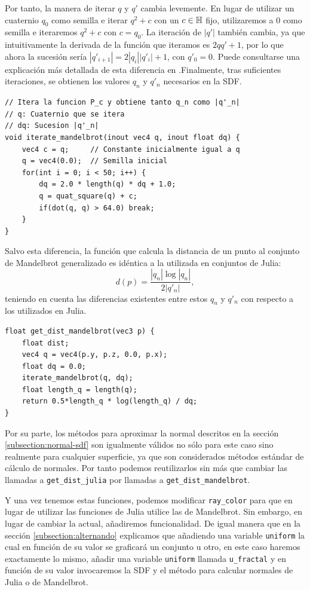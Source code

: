 Por tanto, la manera de iterar $q$ y $q'$ cambia levemente. En lugar de utilizar un cuaternio $q_0$ como semilla e iterar $q^2+c$ con un $c\in\mathbb{H}$ fijo, utilizaremos a $0$ como semilla e iteraremos $q^2+c$ con $c=q_0$. La iteración de $|q'|$ también cambia, ya que intuitivamente la derivada de la función que iteramos es $2qq'+1$, por lo que ahora la sucesión sería $|q'_{i+1}|=2|q_i||q'_i|+1$, con $q'_0=0$. Puede consultarse una explicación más detallada de esta diferencia en \cite{distance-fractals}.Finalmente, tras suficientes iteraciones, se obtienen los valores $q_n$ y $q'_n$ necesarios en la SDF.

\begin{lstlisting}
// Itera la funcion P_c y obtiene tanto q_n como |q'_n|
// q: Cuaternio que se itera
// dq: Sucesion |q'_n|
void iterate_mandelbrot(inout vec4 q, inout float dq) {
    vec4 c = q;     // Constante inicialmente igual a q
    q = vec4(0.0);  // Semilla inicial
    for(int i = 0; i < 50; i++) {
        dq = 2.0 * length(q) * dq + 1.0;
        q = quat_square(q) + c;
        if(dot(q, q) > 64.0) break;
    }
}
\end{lstlisting}

Salvo esta diferencia, la función que calcula la distancia de un punto al conjunto de Mandelbrot generalizado es idéntica a la utilizada en conjuntos de Julia: 
$$
d(p)=\dfrac{|q_n|\log|q_n|}{2|q'_n|},
$$
teniendo en cuenta las diferencias existentes entre estos $q_n$ y $q'_n$ con respecto a los utilizados en Julia.

\begin{lstlisting}
float get_dist_mandelbrot(vec3 p) {
    float dist;
    vec4 q = vec4(p.y, p.z, 0.0, p.x);
    float dq = 0.0;
    iterate_mandelbrot(q, dq);
    float length_q = length(q);
    return 0.5*length_q * log(length_q) / dq;
}
\end{lstlisting}

Por su parte, los métodos para aproximar la normal descritos en la sección \ref{subsection:normal-sdf} son igualmente válidos no sólo para este caso sino realmente para cualquier superficie, ya que son considerados métodos estándar de cálculo de normales. Por tanto podemos reutilizarlos sin más que cambiar las llamadas a \verb|get_dist_julia| por llamadas a \verb|get_dist_mandelbrot|. 

Y una vez tenemos estas funciones, podemos modificar \verb|ray_color| para que en lugar de utilizar las funciones de Julia utilice las de Mandelbrot. Sin embargo, en lugar de cambiar la actual, añadiremos funcionalidad. De igual manera que en la sección \ref{subsection:alternando} explicamos que añadiendo una variable \verb|uniform| la cual en función de su valor se graficará un conjunto u otro, en este caso haremos exactamente lo mismo, añadir una variable \verb|uniform| llamada \verb|u_fractal| y en función de su valor invocaremos la SDF y el método para calcular normales de Julia o de Mandelbrot.

